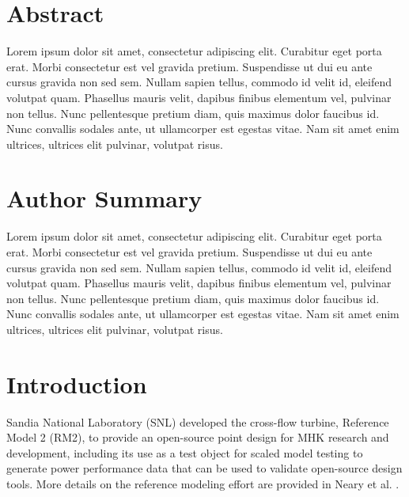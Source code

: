 \documentclass[10pt,letterpaper]{article}
\begin{document}
\listoftodos

\section*{Abstract}

Lorem ipsum dolor sit amet, consectetur adipiscing elit. Curabitur eget porta
erat. Morbi consectetur est vel gravida pretium. Suspendisse ut dui eu ante
cursus gravida non sed sem. Nullam sapien tellus, commodo id velit id, eleifend
volutpat quam. Phasellus mauris velit, dapibus finibus elementum vel, pulvinar
non tellus. Nunc pellentesque pretium diam, quis maximus dolor faucibus id. Nunc
convallis sodales ante, ut ullamcorper est egestas vitae. Nam sit amet enim
ultrices, ultrices elit pulvinar, volutpat risus.


\section*{Author Summary}
Lorem ipsum dolor sit amet, consectetur adipiscing elit. Curabitur eget porta
erat. Morbi consectetur est vel gravida pretium. Suspendisse ut dui eu ante
cursus gravida non sed sem. Nullam sapien tellus, commodo id velit id, eleifend
volutpat quam. Phasellus mauris velit, dapibus finibus elementum vel, pulvinar
non tellus. Nunc pellentesque pretium diam, quis maximus dolor faucibus id. Nunc
convallis sodales ante, ut ullamcorper est egestas vitae. Nam sit amet enim
ultrices, ultrices elit pulvinar, volutpat risus.

\linenumbers

\section*{Introduction}
Sandia National Laboratory (SNL) developed the cross-flow turbine, Reference
Model 2 (RM2), to provide an open-source point design for MHK research and
development, including its use as a test object for scaled model testing to
generate power performance data that can be used to validate open-source design
tools. More details on the reference modeling effort are provided in Neary et
al. \cite{Neary2014}.
\end{document}
